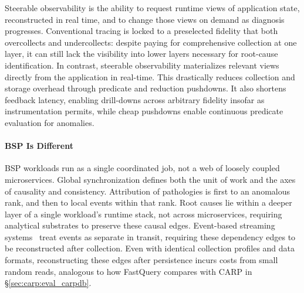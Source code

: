 Steerable observability is the ability to request runtime views of application state, reconstructed
in real time, and to change those views on demand as diagnosis progresses.
Conventional tracing is locked to a preselected fidelity that both overcollects and undercollects:
despite paying for comprehensive collection at one layer, it can still lack the
visibility into lower layers necessary for root-cause identification.
In contrast, steerable observability materializes relevant views directly from the application in
real-time.
This drastically reduces collection and storage overhead through predicate and reduction pushdowns.
It also shortens feedback latency, enabling drill-downs across arbitrary fidelity insofar as
instrumentation permits, while cheap pushdowns enable continuous predicate evaluation for
anomalies.



\paragraph{BSP Is Different}
BSP workloads run as a single coordinated job, not a web of loosely coupled microservices.
Global synchronization defines both the unit of work and the axes of causality and consistency.
Attribution of pathologies is first to an anomalous rank, and then to local events
within that rank.
Root causes lie within a deeper layer of a single workload's runtime stack, not across
microservices,
requiring analytical substrates to preserve these causal edges.
Event-based streaming systems~\cite{Kreps2011:Kafka,Carbo2015:ApacheFlink} treat
events as separate in transit, requiring these dependency edges to be reconstructed after
collection.
Even with identical collection profiles and data formats,
reconstructing these edges after persistence incurs costs from small random reads,
analogous to how FastQuery compares with CARP in \S\ref{sec:carp:eval_carpdb}.

